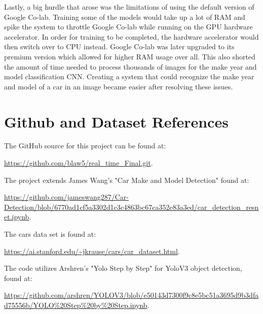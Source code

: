 \documentclass[conference]{IEEEtran}
\begin{document}
Lastly, a big hurdle that arose was the limitations of using the default version of Google Co-lab. Training some of the models would take up a lot of RAM and spike the system to throttle Google Co-lab while running on the GPU hardware accelerator. In order for training to be completed, the hardware accelerator would then switch over to CPU instead. Google Co-lab was later upgraded to its premium version which allowed for higher RAM usage over all. This also shorted the amount of time needed to process thousands of images for the make year and model classification CNN. Creating a system that could recognize the make year and model of a car in an image became easier after resolving these issues.

\section{Github and Dataset References}

The GitHub source for this project can be found at:

\url{https://github.com/blaw5/real_time_Final.git}.

The project extends James Wang's "Car Make and Model Detection" found at:

\url{https://github.com/jameswang287/Car-Detection/blob/6770ad1cf5a3302d1c3c4863bc67ca352e83a3ed/car_detection_resnet.ipynb}.

The cars data set is found at:

\url{https://ai.stanford.edu/~jkrause/cars/car_dataset.html}.

The code utilizes Arshren's "Yolo Step by Step" for YoloV3 object detection, found at:

\url{https://github.com/arshren/YOLOV3/blob/e50143d7300f9c8e5bc51a3695d9b3dfad75556b/YOLO%20Step%20by%20Step.ipynb}.
\end{document}
